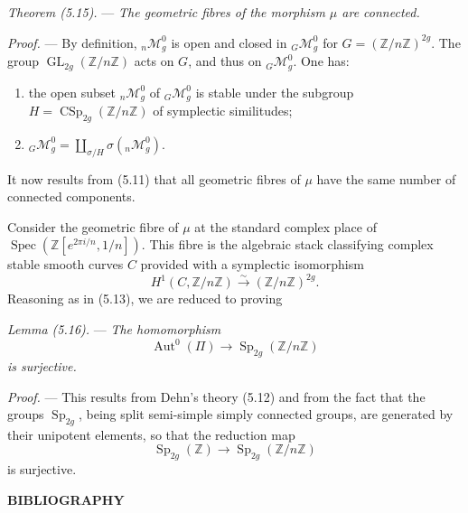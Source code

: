 \documentclass[10pt]{article}
\newcommand{\Spec}{\operatorname{Spec}}
\newcommand{\Aut}{\operatorname{Aut}}
\begin{document}
\medskip
\noindent\emph{Theorem (5.15).} --- \emph{The geometric fibres of the morphism $\mu$ are connected.}

\noindent\emph{Proof.} --- By definition, ${}_n\mathcal M_g^0$ is open and closed in ${}_G\mathcal M_g^0$ for $G=(\mathbb Z/n\mathbb Z)^{2g}$. The group $\operatorname{GL}_{2g}(\mathbb Z/n\mathbb Z)$ acts on $G$, and thus on ${}_G\mathcal M_g^0$. One has:
\begin{enumerate}[label=(\roman*)]
\item the open subset ${}_n\mathcal M_g^0$ of ${}_G\mathcal M_g^0$ is stable under the subgroup $H=\operatorname{CSp}_{2g}(\mathbb Z/n\mathbb Z)$ of symplectic similitudes;
\item ${}_G\mathcal M_g^0=\coprod_{\sigma/H}\sigma({}_n\mathcal M_g^0)$.
\end{enumerate}

It now results from (5.11) that all geometric fibres of $\mu$ have the same number of connected components.

Consider the geometric fibre of $\mu$ at the standard complex place of $\Spec(\mathbb Z[e^{2\pi i/n},1/n])$. This fibre is the algebraic stack classifying complex stable smooth curves $C$ provided with a symplectic isomorphism
\[
H^1(C,\mathbb Z/n\mathbb Z)\xrightarrow{\sim}(\mathbb Z/n\mathbb Z)^{2g}.
\]
Reasoning as in (5.13), we are reduced to proving

\medskip
\noindent\emph{Lemma (5.16).} --- \emph{The homomorphism}
\[
\Aut^0(\Pi)\longrightarrow \operatorname{Sp}_{2g}(\mathbb Z/n\mathbb Z)
\]
\emph{is surjective.}

\noindent\emph{Proof.} --- This results from Dehn's theory (5.12) and from the fact that the groups $\operatorname{Sp}_{2g}$, being split semi-simple simply connected groups, are generated by their unipotent elements, so that the reduction map
\[
\operatorname{Sp}_{2g}(\mathbb Z)\longrightarrow \operatorname{Sp}_{2g}(\mathbb Z/n\mathbb Z)
\]
is surjective.

\begin{center}
{\bfseries BIBLIOGRAPHY}
\end{center}
\end{document}
